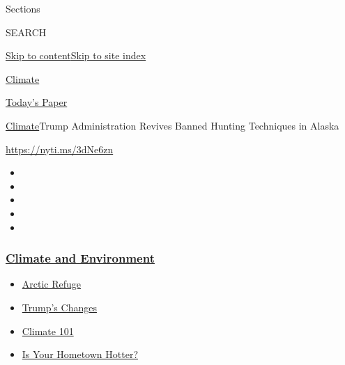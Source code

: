 Sections

SEARCH

\protect\hyperlink{site-content}{Skip to
content}\protect\hyperlink{site-index}{Skip to site index}

\href{https://www.nytimes3xbfgragh.onion/section/climate}{Climate}

\href{https://myaccount.nytimes3xbfgragh.onion/auth/login?response_type=cookie\&client_id=vi}{}

\href{https://www.nytimes3xbfgragh.onion/section/todayspaper}{Today's
Paper}

\href{/section/climate}{Climate}\textbar{}Trump Administration Revives
Banned Hunting Techniques in Alaska

\url{https://nyti.ms/3dNe6zn}

\begin{itemize}
\item
\item
\item
\item
\item
\end{itemize}

\hypertarget{climate-and-environment}{%
\subsubsection{\texorpdfstring{\href{https://www.nytimes3xbfgragh.onion/section/climate?name=styln-climate\&region=TOP_BANNER\&variant=undefined\&block=storyline_menu_recirc\&action=click\&pgtype=Article\&impression_id=23246b10-e38b-11ea-9071-1b348425d2c9}{Climate
and
Environment}}{Climate and Environment}}\label{climate-and-environment}}

\begin{itemize}
\tightlist
\item
  \href{https://www.nytimes3xbfgragh.onion/2020/08/17/climate/alaska-oil-drilling-anwr.html?name=styln-climate\&region=TOP_BANNER\&variant=undefined\&block=storyline_menu_recirc\&action=click\&pgtype=Article\&impression_id=23246b11-e38b-11ea-9071-1b348425d2c9}{Arctic
  Refuge}
\item
  \href{https://www.nytimes3xbfgragh.onion/interactive/2020/climate/trump-environment-rollbacks.html?name=styln-climate\&region=TOP_BANNER\&variant=undefined\&block=storyline_menu_recirc\&action=click\&pgtype=Article\&impression_id=23246b12-e38b-11ea-9071-1b348425d2c9}{Trump's
  Changes}
\item
  \href{https://www.nytimes3xbfgragh.onion/interactive/2020/04/19/climate/climate-crash-course-1.html?name=styln-climate\&region=TOP_BANNER\&variant=undefined\&block=storyline_menu_recirc\&action=click\&pgtype=Article\&impression_id=23246b13-e38b-11ea-9071-1b348425d2c9}{Climate
  101}
\item
  \href{https://www.nytimes3xbfgragh.onion/interactive/2018/08/30/climate/how-much-hotter-is-your-hometown.html?name=styln-climate\&region=TOP_BANNER\&variant=undefined\&block=storyline_menu_recirc\&action=click\&pgtype=Article\&impression_id=23246b14-e38b-11ea-9071-1b348425d2c9}{Is
  Your Hometown Hotter?}
\end{itemize}

